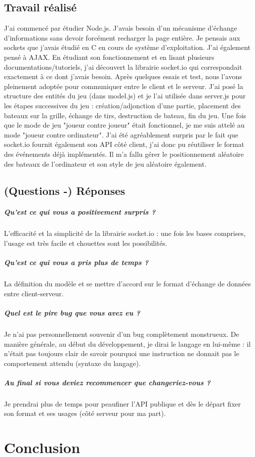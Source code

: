 \documentclass[a4paper, 11pt]{article}
\begin{document}
\subsection{Travail réalisé}
J'ai commencé par étudier Node.js. J'avais besoin d'un mécanisme d'échange d'informations sans devoir forcément recharger la page entière. Je pensais aux sockets que j'avais étudié en C en cours de système d'exploitation. J'ai également pensé à AJAX. En étudiant son fonctionnement et en lisant plusieurs documentations/tutoriels, j'ai découvert la librairie socket.io qui correspondait exactement à ce dont j'avais besoin. Après quelques essais et test, nous l'avons pleinement adoptée pour communiquer entre le client et le serveur. J'ai posé la structure des entités du jeu (dans model.js) et je l'ai utilisée dans server.js pour les étapes successives du jeu : création/adjonction d'une partie, placement des bateaux sur la grille, échange de tirs, destruction de bateau, fin du jeu. Une fois que le mode de jeu "joueur contre joueur" était fonctionnel, je me suis attelé au mode "joueur contre ordinateur". J'ai été agréablement surpris par le fait que socket.io fournit également son API côté client, j'ai donc pu réutiliser le format des événements déjà implémentés. Il m'a fallu gérer le positionnement aléatoire des bateaux de l'ordinateur et son style de jeu aléatoire également.

\subsection{(Questions -) Réponses}
\subparagraph{Qu’est ce qui vous a positivement surpris ?}
L'efficacité et la simplicité de la librairie socket.io : une fois les bases comprises, l'usage est très facile et chouettes sont les possibilités.
\subparagraph{Qu’est ce qui vous a pris plus de temps ?}
La définition du modèle et se mettre d'accord sur le format d'échange de données entre client-serveur.
\subparagraph{Quel est le pire bug que vous avez eu ?}
Je n'ai pas personnellement souvenir d'un bug complètement monstrueux. De manière générale, au début du développement, je dirai le langage en lui-même : il n'était pas toujours clair de savoir pourquoi une instruction ne donnait pas le comportement attendu (syntaxe du langage).
\subparagraph{Au final si vous deviez recommencer que changeriez-vous ?}
Je prendrai plus de temps pour peaufiner l'API publique et dès le départ fixer son format et ses usages (côté serveur pour ma part).

\section{Conclusion}
\end{document}
